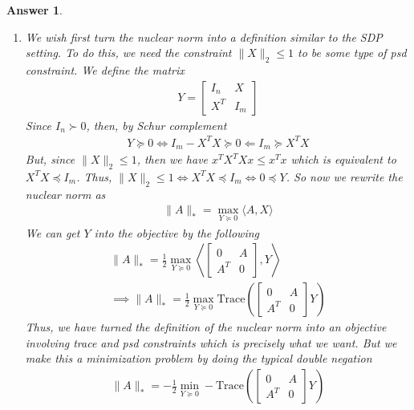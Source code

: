 \documentclass[12pt]{article}
\theoremstyle{colon}
\newtheorem*{answer}{Answer}
\begin{document}
\begin{answer}
\begin{enumerate}[label=\arabic*)]
    \item We wish first turn the nuclear norm into a definition similar to the SDP setting. To do this, we need the constraint $\lVert X \rVert_2 \leq 1$ to be some type of psd constraint. We define the matrix
      \begin{gather*}
        Y = \begin{bmatrix}
          I_n & X \\
          X^T & I_m
        \end{bmatrix}
      \end{gather*}
      Since $I_n \succ 0$, then, by Schur complement
      \begin{gather*}
        Y \succeq 0 \Longleftrightarrow I_m - X^T X \succeq 0 \Longleftarrow I_m \succeq X^T X
      \end{gather*}
      But, since $\lVert X \rVert_2 \leq 1$, then we have $x^T X^T X x \leq x^T x$ which is equivalent to $X^T X \preceq I_m$. Thus, $\lVert X \rVert_2 \leq 1 \Longleftrightarrow X^T X \preceq I_m \Longleftrightarrow 0 \preceq Y$. So now we rewrite the nuclear norm as
      \begin{gather*}
        \lVert A \rVert_* = \max_{Y \succeq 0} \langle A, X \rangle
      \end{gather*}
      We can get $Y$ into the objective by the following
      \begin{gather*}
        \lVert A \rVert_* = \frac{1}{2} \max_{Y \succeq 0} \left\langle \begin{bmatrix} 0 & A \\ A^T & 0 \end{bmatrix}, Y \right\rangle \\
        \implies \lVert A \rVert_* = \frac{1}{2} \max_{Y \succeq 0} \text{Trace} \left( \begin{bmatrix} 0 & A \\ A^T & 0 \end{bmatrix} Y \right)
      \end{gather*}
      Thus, we have turned the definition of the nuclear norm into an objective involving trace and psd constraints which is precisely what we want. But we make this a minimization problem by doing the typical double negation
      \begin{gather*}
        \lVert A \rVert_* = -\frac{1}{2} \min_{Y \succeq 0} -\text{Trace} \left( \begin{bmatrix} 0 & A \\ A^T & 0 \end{bmatrix} Y \right)
      \end{gather*}


\end{enumerate}
\end{answer}
\end{document}

